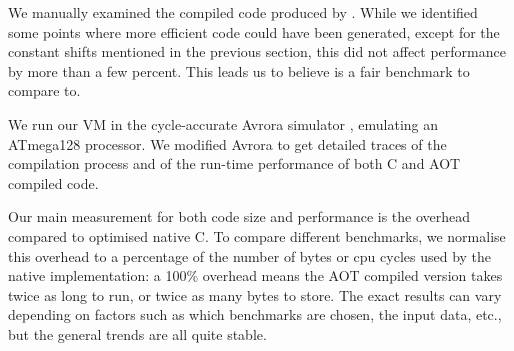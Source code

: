 We manually examined the compiled code produced by . While we identified some points where more efficient code could have been generated, except for the constant shifts mentioned in the previous section, this did not affect performance by more than a few percent. This leads us to believe  is a fair benchmark to compare to.

We run our VM in the cycle-accurate Avrora simulator \cite{Titzer:2005vb}, emulating an ATmega128 processor. We modified Avrora to get detailed traces of the compilation process and of the run-time performance of both C and AOT compiled code.

Our main measurement for both code size and performance is the overhead compared to optimised native C. To compare different benchmarks, we normalise this overhead to a percentage of the number of bytes or cpu cycles used by the native implementation: a 100\% overhead means the AOT compiled version takes twice as long to run, or twice as many bytes to store. The exact results can vary depending on factors such as which benchmarks are chosen, the input data, etc., but the general trends are all quite stable.
